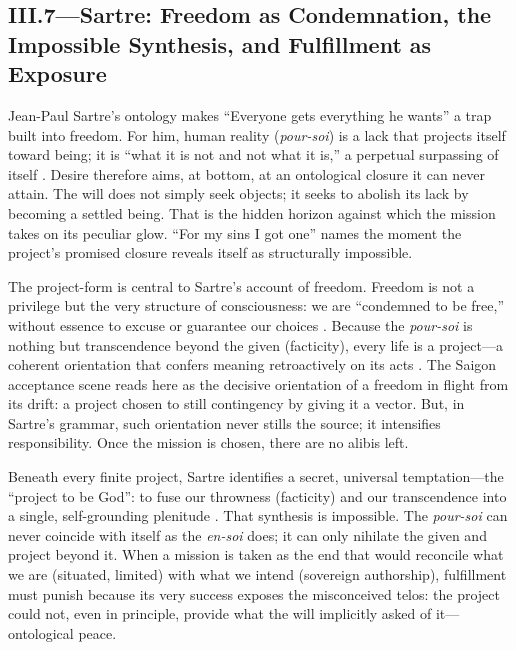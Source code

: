 \subsection*{III.7—Sartre: Freedom as Condemnation, the Impossible Synthesis, and Fulfillment as
	Exposure}
\label{ssec:iii-sartre}
Jean-Paul Sartre's ontology makes ``Everyone gets everything he wants'' a trap built into
freedom. For him, human reality (\emph{pour-soi}) is a lack that projects itself toward being;
it is ``what
it is not and not what it is,'' a perpetual surpassing of itself
\parencite[pp.~100--110]{SartreBN2003}. Desire therefore aims, at bottom, at an ontological
closure it can never attain. The will does not simply seek objects; it seeks to abolish its
lack by becoming a settled being. That is the hidden horizon against which the mission takes on
its peculiar glow. ``For my sins I got one'' names the moment the project's promised closure
reveals itself as structurally impossible.

The project-form is central to Sartre's account of freedom. Freedom is not a privilege but the
very structure of consciousness: we are ``condemned to be free,'' without essence to excuse or
guarantee our choices \parencite[pp.~34--36]{SartreBN2003}. Because the \emph{pour-soi} is
nothing but transcendence beyond the given (facticity), every life is a project—a coherent
orientation that confers meaning retroactively on its acts
\parencite[pp.~561--569]{SartreBN2003}. The Saigon acceptance scene reads here as the decisive
orientation of a freedom in flight from its drift: a project chosen to still contingency by
giving it a vector. But, in Sartre's grammar, such orientation never stills the source; it
intensifies responsibility. Once the mission is chosen, there are no alibis left.

Beneath every finite project, Sartre identifies a secret, universal temptation—the ``project to
be God'': to fuse our throwness (facticity) and our transcendence into a single, self-grounding
plenitude \parencite[pp.~586--604]{SartreBN2003}. That synthesis is impossible. The
\emph{pour-soi} can never coincide with itself as the \emph{en-soi} does; it can only nihilate
the given and project beyond it. When a mission is taken as the end that would reconcile what
we are (situated, limited) with what we intend (sovereign authorship), fulfillment must punish
because its very success exposes the misconceived telos: the project could not, even in
principle, provide what the will implicitly asked of it—ontological peace.


